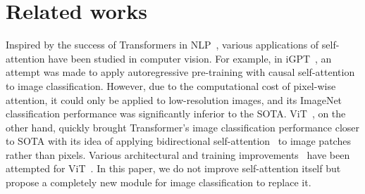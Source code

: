 \documentclass{article}
\begin{document}
\section{Related works}

Inspired by the success of Transformers in NLP~\cite{vaswani2017attention,devlin2018bert,radford2018improving, radford2019language, brown2020language, raffel2020exploring}, various applications of self-attention have been studied in computer vision. For example, in iGPT~\cite{chen2020generative}, an attempt was made to apply autoregressive pre-training with causal self-attention~\cite{radford2018improving} to image classification. However, due to the computational cost of pixel-wise attention, it could only be applied to low-resolution images, and its ImageNet classification performance was significantly inferior to the SOTA. ViT~\cite{dosovitskiy2020image}, on the other hand, quickly brought Transformer's image classification performance closer to SOTA with its idea of applying bidirectional self-attention~\cite{devlin2018bert} to image patches rather than pixels. Various architectural and training improvements~\cite{touvron2020training, yuan2021tokens, wang2021pyramid, zhou2021deepvit, liu2021swin, touvron2021going, chen2021crossvit} have been attempted for ViT~\cite{dosovitskiy2020image}. In this paper, we do not improve self-attention itself but propose a completely new module for image classification to replace it.
\end{document}
